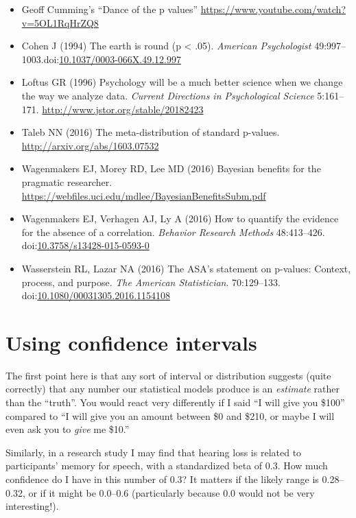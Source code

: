 \documentclass[letterpaper,oneside,11pt,article, portrait]{memoir}
\newcommand{\doi}[1]{doi:\href{http://dx.doi.org/#1}{#1}}
\newcommand{\journal}[1]{\textit{#1}} 			%
\begin{document}
\begin{itemize}

\item Geoff Cumming's ``Dance of the p values'' \url{https://www.youtube.com/watch?v=5OL1RqHrZQ8}
\item Cohen J (1994) The earth is round (p < .05). \journal{American Psychologist} 49:997--1003.\newline \doi{10.1037/0003-066X.49.12.997}
\item Loftus GR (1996) Psychology will be a much better science when we change the way we analyze data. \journal{Current Directions in Psychological Science} 5:161--171. \url{ http://www.jstor.org/stable/20182423}
\item Taleb NN (2016) The meta-distribution of standard p-values. \url{http://arxiv.org/abs/1603.07532}
\item Wagenmakers EJ, Morey RD, Lee MD (2016) Bayesian benefits for the pragmatic researcher. \url{https://webfiles.uci.edu/mdlee/BayesianBenefitsSubm.pdf}
\item Wagenmakers EJ, Verhagen AJ, Ly A (2016) How to quantify the evidence for the absence of a correlation. \journal{Behavior Research Methods} 48:413--426. \doi{10.3758/s13428-015-0593-0}
\item Wasserstein RL, Lazar NA (2016) The ASA's statement on p-values: Context, process, and purpose. \journal{The American Statistician}. 70:129--133. \doi{10.1080/00031305.2016.1154108}

\end{itemize}


\chapter{Using confidence intervals} \label{CI}

The first point here is that any sort of interval or distribution suggests (quite correctly) that any number our statistical models produce is an \textit{estimate} rather than the ``truth''. You would react very differently if I said ``I will give you \$100'' compared to ``I will give you an amount between \$0 and \$210, or maybe I will even ask you to \textit{give} me \$10.''

Similarly, in a research study I may find that hearing loss is related to participants' memory for speech, with a standardized beta of 0.3. How much confidence do I have in this number of 0.3? It matters if the likely range is 0.28--0.32, or if it might be 0.0--0.6 (particularly because 0.0 would not be very interesting!).
\end{document}
